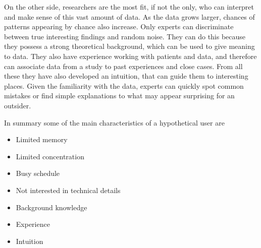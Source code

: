 On the other side, researchers are the most fit, if not the only, who can interpret and make sense of this vast amount of data. As the data grows larger, chances of patterns appearing by chance also increase. Only experts can discriminate between true interesting findings and random noise. They can do this because they possess a strong theoretical background, which can be used to give meaning to data. They also have experience working with patients and data, and therefore can associate data from a study to past experiences and close cases. From all these they have also developed an intuition, that can guide them to interesting places. Given the familiarity with the data, experts can quickly spot common mistakes or find simple explanations to what may appear surprising for an outsider. 

In summary some of the main characteristics of a hypothetical user are

\begin{itemize}
\item Limited memory
\item Limited concentration
\item Busy schedule
\item Not interested in technical details
\item Background knowledge
\item Experience
\item Intuition
\end{itemize}




